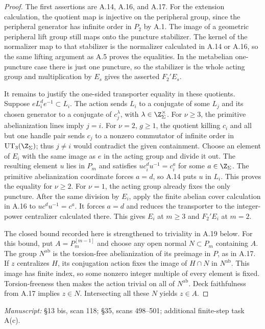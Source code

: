 \begin{proof}
The first assertions are A.14, A.16, and A.17. For the extension calculation, the quotient map is injective on the peripheral group, since the peripheral generator has infinite order in $P_2$ by A.1. The image of a geometric peripheral lift group still maps onto the puncture stabilizer. The kernel of the normalizer map to that stabilizer is the normalizer calculated in A.14 or A.16, so the same lifting argument as A.5 proves the equalities. In the metabelian one-puncture case there is just one puncture, so the stabilizer is the whole acting group and multiplication by $E_s$ gives the asserted $F_2'E_s$.

It remains to justify the one-sided transporter equality in these quotients. Suppose $eL_i^de^{-1}\subset L_i$. The action sends $L_i$ to a conjugate of some $L_j$ and its chosen generator to a conjugate of $c_j^\lambda$, with $\lambda\in\Z_\Sigma^\times$. For $\nu\ge3$, the primitive abelianization lines imply $j=i$. For $\nu=2$, $g\ge1$, the quotient killing $c_i$ and all but one handle pair sends $c_j$ to a nonzero commutator of infinite order in $\operatorname{UT}_3(\Z_\Sigma)$; thus $j\ne i$ would contradict the given containment. Choose an element of $E_i$ with the same image as $e$ in the acting group and divide it out. The resulting element $u$ lies in $P_m$ and satisfies $uc_i^du^{-1}=c_i^a$ for some $a\in\Z_\Sigma$. The primitive abelianization coordinate forces $a=d$, so A.14 puts $u$ in $L_i$. This proves the equality for $\nu\ge2$. For $\nu=1$, the acting group already fixes the only puncture. After the same division by $E_i$, apply the finite abelian cover calculation in A.16 to $uc^du^{-1}=c^a$. It forces $a=d$ and reduces the transporter to the integer-power centralizer calculated there. This gives $E_i$ at $m\ge3$ and $F_2'E_i$ at $m=2$.

The closed bound recorded here is strengthened to triviality in A.19 below. For this bound, put $A=P_m^{[m-1]}$ and choose any open normal $N\subset P_m$ containing $A$. The group $N^{\mathrm{ab}}$ is the torsion-free abelianization of its preimage in $P$, as in A.17. If $z$ centralizes $H$, its conjugation action fixes the image of $H\cap N$ in $N^{\mathrm{ab}}$. This image has finite index, so some nonzero integer multiple of every element is fixed. Torsion-freeness then makes the action trivial on all of $N^{\mathrm{ab}}$. Deck faithfulness from A.17 implies $z\in N$. Intersecting all these $N$ yields $z\in A$.
\end{proof}
\noindent\emph{Manuscript:} \S13 bis, scan 118; \S35, scans 498--501; additional finite-step task A(c).

